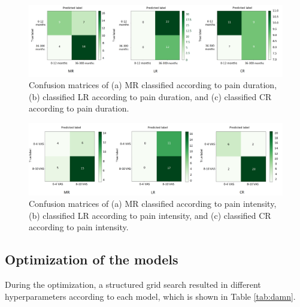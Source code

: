 \begin{figure} [b!]
    \includegraphics[width=1\textwidth]{Figures/samcon}
  \caption{Confusion matrices of (a) MR classified according to pain duration, (b) classified LR according to pain duration, and (c) classified CR according to pain duration.}
  \label{fig:confma}
\end{figure}

\begin{figure} [t!]
    \includegraphics[width=1\textwidth]{Figures/samcon1}
  \caption{Confusion matrices of (a) MR classified according to pain intensity, (b) classified LR according to pain intensity, and (c) classified CR according to pain intensity.}
  \label{fig:confma1}
\end{figure}

\vspace{-0.3cm}
\subsection{Optimization of the models}
During the optimization, a structured grid search resulted in different hyperparameters according to each model, which is shown in Table \ref{tab:damn}.

